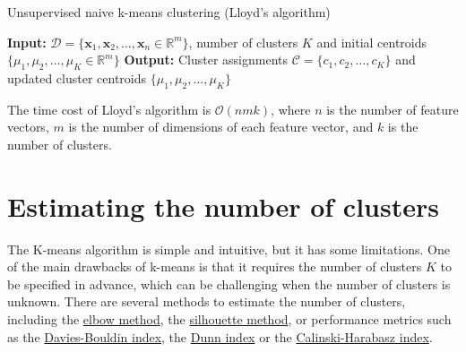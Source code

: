 \documentclass{article}[11pt]
\newcommand{\norm}[1]{\left|\left|#1\right|\right|}
\DeclareMathOperator*{\argmin}{arg\,min}
\begin{document}
\begin{algorithm}[H]
   \begin{algorithmic}
   \caption{Unsupervised naive k-means clustering (Lloyd's algorithm)}\label{alg:kmeans}
   \State \textbf{Input:} $\mathcal{D} = \{\mathbf{x}_1, \mathbf{x}_2, \ldots, \mathbf{x}_n\in\mathbb{R}^{m}\}$, number of clusters $K$ and initial centroids $\{\mu_1, \mu_2, \ldots, \mu_K\in\mathbb{R}^{m}\}$
   \State \textbf{Output:} Cluster assignments $\mathcal{C} = \{c_1, c_2, \ldots, c_K\}$ and updated cluster centroids $\{\mu_1, \mu_2, \ldots, \mu_K\}$
      \State{$c_{i}\gets\argmin_{j} \norm{\mathbf{x} - \mu_j}^2$}
   \EndFor 
   \Statex
   \State{$\hat{\mu}\gets\mu$}
   \EndFor
   \Statex
   \If{$\norm{\mu - \hat{\mu}} < \epsilon$}
   \EndIf
   \EndWhile
   \end{algorithmic}
\end{algorithm}
The time cost of Lloyd’s algorithm is $\mathcal{O}(nmk)$, where $n$ is the number of feature vectors, $m$ is the number of dimensions of each feature vector,
and $k$ is the number of clusters.

\section{Estimating the number of clusters}
The K-means algorithm is simple and intuitive, but it has some limitations.
One of the main drawbacks of k-means is that it requires the number of clusters $K$ to be specified in advance, which can be challenging when the number of clusters is unknown.
There are several methods to estimate the number of clusters, including the \href{https://en.wikipedia.org/wiki/Elbow_method_(clustering)}{elbow method}, 
the \href{https://en.wikipedia.org/wiki/Silhouette_(clustering)}{silhouette method}, or performance metrics 
such as the \href{https://en.wikipedia.org/wiki/Davies%E2%80%93Bouldin_index}{Davies-Bouldin index}, the \href{https://en.wikipedia.org/wiki/Dunn_index}{Dunn index}
or the \href{https://en.wikipedia.org/wiki/Calinski%E2%80%93Harabasz_index}{Calinski-Harabasz index}.
\end{document}
